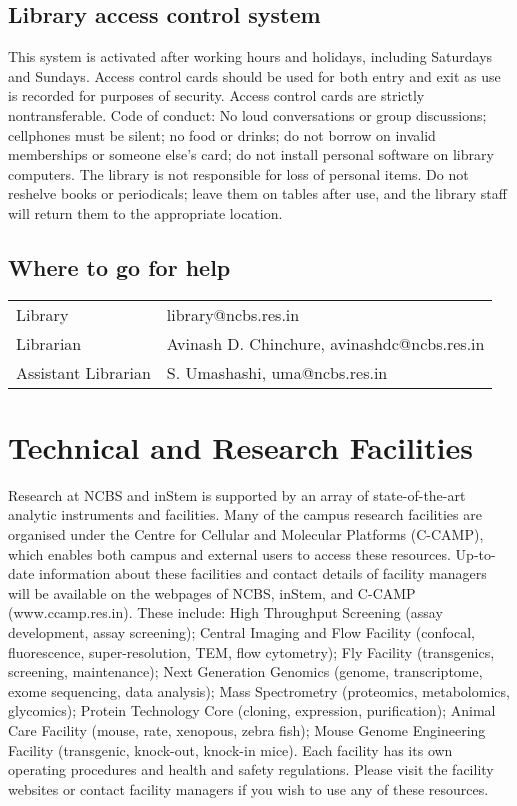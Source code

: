 \documentclass[a4paper,10pt]{article}
\begin{document}
\subsection{Library access control system} This system is activated after
working hours and holidays, including Saturdays and Sundays. Access control
cards should be used for both entry and exit as use is recorded for purposes of
security. Access control cards are strictly nontransferable.  Code of conduct:
No loud conversations or group discussions; cellphones must be silent; no food
or drinks; do not borrow on invalid memberships or someone else’s card; do not
install personal software on library computers. The library is not responsible
for loss of personal items. Do not reshelve books or periodicals; leave them on
tables after use, and the library staff will return them to the appropriate
location.  

\subsection{Where to go for help} 
\begin{tabular}{l l}
Library & library@ncbs.res.in \\
Librarian & Avinash D. Chinchure, avinashdc@ncbs.res.in \\
Assistant Librarian & S. Umashashi, uma@ncbs.res.in
\end{tabular} \newline \newline \newline \newline

\section{Technical and Research Facilities}

Research at NCBS and inStem is supported by an array of state-of-the-art
analytic instruments and facilities. Many of the campus research facilities are
organised under the Centre for Cellular and Molecular Platforms (C-CAMP), which
enables both campus and external users to access these resources. Up-to-date
information about these facilities and contact details of facility managers will
be available on the webpages of NCBS, inStem, and C-CAMP (www.ccamp.res.in).
These include: High Throughput Screening (assay development, assay screening);
Central Imaging and Flow Facility (confocal, fluorescence, super-resolution,
TEM, flow cytometry); Fly Facility (transgenics, screening, maintenance); Next
Generation Genomics (genome, transcriptome, exome sequencing, data analysis);
Mass Spectrometry (proteomics, metabolomics, glycomics); Protein Technology Core
(cloning, expression, purification); Animal Care Facility (mouse, rate,
xenopous, zebra fish); Mouse Genome Engineering Facility (transgenic, knock-out,
knock-in mice). Each facility has its own operating procedures and health and
safety regulations. Please visit the facility websites or contact facility
managers if you wish to use any of these resources.
\end{document}
